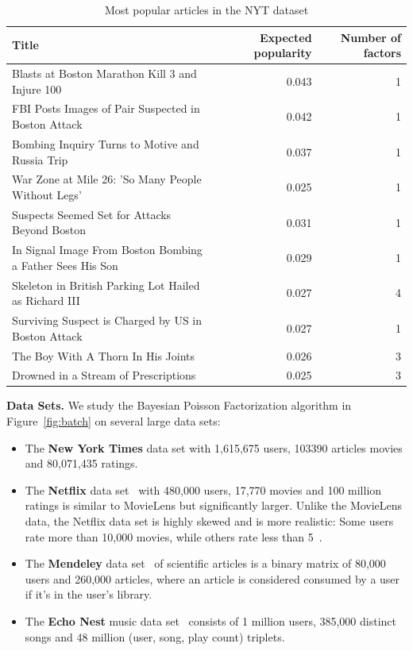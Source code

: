 \begin{table}
\centering
\caption{Most popular articles in the NYT dataset}
\begin{tabular}{|l|r|r|} \hline
Title & Expected popularity & Number of factors\\\hline
Blasts at Boston Marathon Kill 3 and Injure 100 & 0.043 & 1\\\hline
FBI Posts Images of Pair Suspected in Boston Attack & 0.042 & 1\\\hline
Bombing Inquiry Turns to Motive and Russia Trip & 0.037 & 1\\\hline
War Zone at Mile 26: 'So Many People Without Legs' & 0.025 & 1\\\hline
Suspects Seemed Set for Attacks Beyond Boston & 0.031 & 1\\\hline
In Signal Image From Boston Bombing a Father Sees His Son & 0.029 & 1\\\hline
Skeleton in British Parking Lot Hailed as Richard III & 0.027 & 4\\\hline
Surviving Suspect is Charged by US in Boston Attack & 0.027 & 1\\\hline
The Boy With A Thorn In His Joints & 0.026 & 3\\\hline
Drowned in a Stream of Prescriptions & 0.025 & 3\\\hline
\end{tabular} 
\end{table}

{\bf Data Sets.} We study the Bayesian Poisson Factorization algorithm
in Figure~\ref{fig:batch} on several large data sets:
\begin{itemize}
\item The {\bf New York Times} data set with 1,615,675 users, 103390
  articles movies and 80,071,435 ratings.
\item The {\bf Netflix} data set~\cite{Koren:2009} with 480,000 users,
  17,770 movies and 100 million ratings is similar to MovieLens but
  significantly larger. Unlike the MovieLens data, the Netflix data
  set is highly skewed and is more realistic: Some users rate more
  than 10,000 movies, while others rate less than
  5~\cite{Salakhutdinov:2008a}.
\item The {\bf Mendeley} data set~\cite{Jack:2010} of scientific
  articles is a binary matrix of
  80,000 users and 260,000 articles, where an article is considered
  consumed by a user if it's in the user's library.
\item The {\bf Echo Nest} music data set~\cite{Bertin-Mahieux:2011} consists of 1
  million users, 385,000 distinct songs and 48 million (user, song,
  play count) triplets.
\end{itemize}

